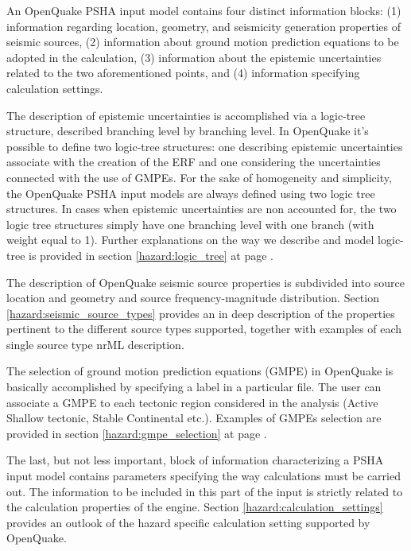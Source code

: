 An OpenQuake PSHA input model contains four distinct information blocks: 
(1) information 
regarding location, geometry, and seismicity generation properties of seismic
sources, (2) information about ground motion prediction equations to be 
adopted in the calculation, (3) information about the epistemic uncertainties 
related to the two aforementioned points, and (4) information specifying 
calculation settings.

The description of epistemic uncertainties is accomplished via a logic-tree 
structure, described branching level by branching level. In OpenQuake it's 
possible to define two logic-tree structures: one describing epistemic 
uncertainties associate with the creation of the ERF and one considering the
uncertainties connected with the use of GMPEs. For the sake of homogeneity 
and simplicity, the OpenQuake PSHA input models are always defined using two 
logic tree structures. In cases when epistemic uncertainties are non accounted
for, the two logic tree structures simply have one branching level with one 
branch (with weight equal to 1).
Further explanations on the way we describe and model logic-tree is provided 
in section \ref{hazard:logic_tree} at page \pageref{hazard:logic_tree}. 

The description of OpenQuake seismic source properties is subdivided into 
source location and geometry and source frequency-magnitude distribution. 
Section \ref{hazard:seismic_source_types} provides an in deep description of 
the properties pertinent to the different source types supported, together 
with examples of each single source type nrML description. 

The selection of ground motion prediction equations (GMPE) in OpenQuake 
is basically accomplished by specifying a label in a particular file.  
The user can associate a GMPE to each tectonic region considered in the 
analysis (Active Shallow tectonic, Stable Continental etc.). Examples of 
GMPEs selection are provided in section \ref{hazard:gmpe_selection} at page 
\pageref{hazard:gmpe_selection}.

The last, but not less important, block of information characterizing a PSHA 
input model contains parameters specifying the way calculations must be 
carried out. The information to be included in this part of the input is 
strictly related to the calculation properties of the engine. Section 
\ref{hazard:calculation_settings} provides an outlook of the hazard specific 
calculation setting supported by OpenQuake. 
%
